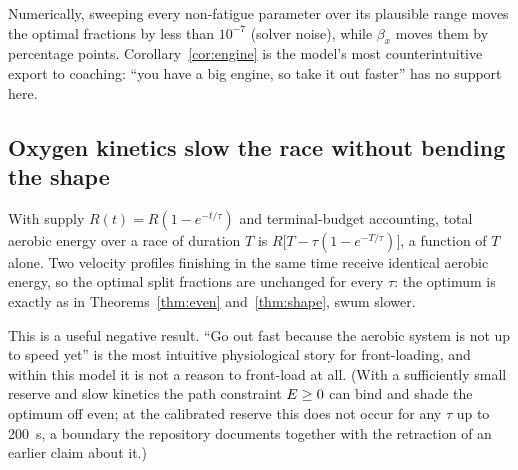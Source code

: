Numerically, sweeping every non-fatigue parameter over its plausible range
moves the optimal fractions by less than $10^{-7}$ (solver noise), while
$\beta_x$ moves them by percentage points. Corollary~\ref{cor:engine} is the
model's most counterintuitive export to coaching: ``you have a big engine, so
take it out faster'' has no support here.

\subsection{Oxygen kinetics slow the race without bending the shape}

\begin{proposition}\label{prop:kinetics}
With supply $R(t) = R(1-e^{-t/\tau})$ and terminal-budget accounting, total
aerobic energy over a race of duration $T$ is
$R\big[T - \tau(1 - e^{-T/\tau})\big]$, a function of $T$ alone. Two
velocity profiles finishing in the same time receive identical aerobic
energy, so the optimal split fractions are unchanged for every $\tau$: the
optimum is exactly as in Theorems~\ref{thm:even} and~\ref{thm:shape}, swum
slower.
\end{proposition}

This is a useful negative result. ``Go out fast because the aerobic system
is not up to speed yet'' is the most intuitive physiological story for
front-loading, and within this model it is not a reason to front-load at
all. (With a sufficiently small reserve and slow kinetics the path
constraint $E \ge 0$ can bind and shade the optimum off even; at the
calibrated reserve this does not occur for any $\tau$ up to 200~s, a
boundary the repository documents together with the retraction of an earlier
claim about it.)
